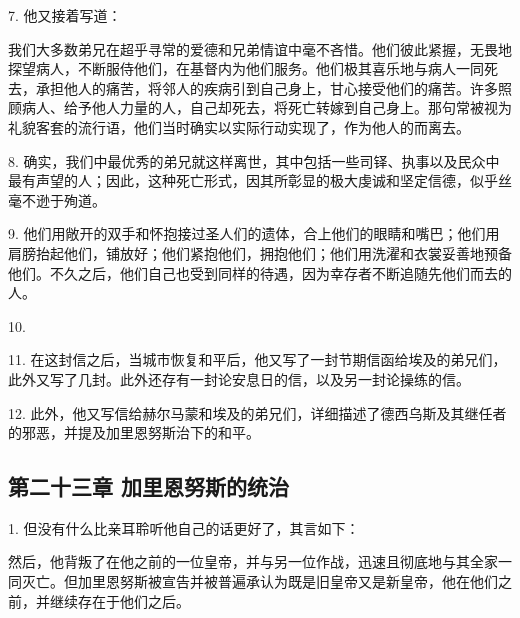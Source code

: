 7. 他又接着写道：\par

我们大多数弟兄在超乎寻常的爱德和兄弟情谊中毫不吝惜。他们彼此紧握，无畏地探望病人，不断服侍他们，在基督内为他们服务。他们极其喜乐地与病人一同死去，承担他人的痛苦，将邻人的疾病引到自己身上，甘心接受他们的痛苦。许多照顾病人、给予他人力量的人，自己却死去，将死亡转嫁到自己身上。那句常被视为礼貌客套的流行语，他们当时确实以实际行动实现了，作为他人的而离去。\par

8. 确实，我们中最优秀的弟兄就这样离世，其中包括一些司铎、执事以及民众中最有声望的人；因此，这种死亡形式，因其所彰显的极大虔诚和坚定信德，似乎丝毫不逊于殉道。\par

9. 他们用敞开的双手和怀抱接过圣人们的遗体，合上他们的眼睛和嘴巴；他们用肩膀抬起他们，铺放好；他们紧抱他们，拥抱他们；他们用洗濯和衣裳妥善地预备他们。不久之后，他们自己也受到同样的待遇，因为幸存者不断追随先他们而去的人。\par

10. \par

11. 在这封信之后，当城市恢复和平后，他又写了一封节期信函给埃及的弟兄们，此外又写了几封。此外还存有一封论安息日的信，以及另一封论操练的信。\par

12. 此外，他又写信给赫尔马蒙和埃及的弟兄们，详细描述了德西乌斯及其继任者的邪恶，并提及加里恩努斯治下的和平。\par


\subsection{第二十三章 加里恩努斯的统治}

1. 但没有什么比亲耳聆听他自己的话更好了，其言如下：\par

然后，他背叛了在他之前的一位皇帝，并与另一位作战，迅速且彻底地与其全家一同灭亡。但加里恩努斯被宣告并被普遍承认为既是旧皇帝又是新皇帝，他在他们之前，并继续存在于他们之后。\par


